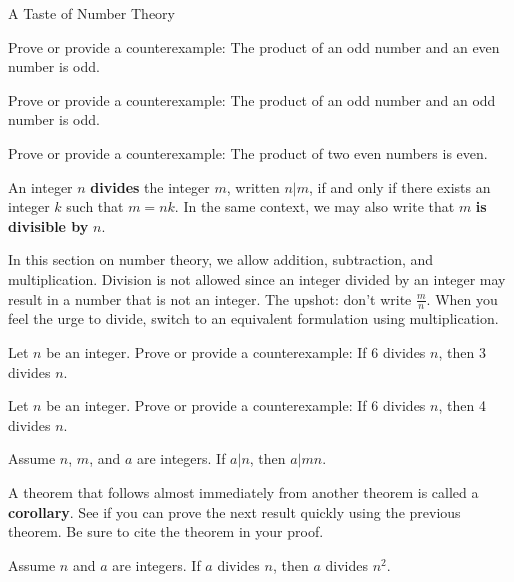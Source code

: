 \begin{section}{A Taste of Number Theory}
\begin{problem}
Prove or provide a counterexample: The product of an odd number and an even number is odd.
\end{problem}

\begin{problem}[*]
Prove or provide a counterexample: The product of an odd number and an odd number is odd.
\end{problem}

\begin{problem}[*]
Prove or provide a counterexample: The product of two even numbers is even.
\end{problem}

\begin{definition}
An integer $n$ \textbf{divides} the integer $m$, written $n|m$, if and only if there exists an integer $k$ such that $m=nk$. In the same context, we may also write that $m$ \textbf{is divisible by} $n$.
\end{definition}

In this section on number theory, we allow addition, subtraction, and multiplication.  Division is not allowed since an integer divided by an integer may result in a number that is not an integer. The upshot: don't write $\frac{m}{n}$.  When you feel the urge to divide, switch to an equivalent formulation using multiplication.

\begin{problem}
Let $n$ be an integer.  Prove or provide a counterexample: If 6 divides $n$, then 3 divides $n$.\end{problem}

\begin{problem}
Let $n$ be an integer.  Prove or provide a counterexample: If 6 divides $n$, then 4 divides $n$.
\end{problem}

\begin{theorem}[*]
Assume $n$, $m$, and $a$ are integers.  If $a|n$, then $a|mn$.
\end{theorem}

A theorem that follows almost immediately from another theorem is called a \textbf{corollary}.  See if you can prove the next result quickly using the previous theorem.  Be sure to cite the theorem in your proof.

\begin{corollary}
Assume $n$ and $a$ are integers.  If $a$ divides $n$, then $a$ divides $n^2$.
\end{corollary}


\end{section}
